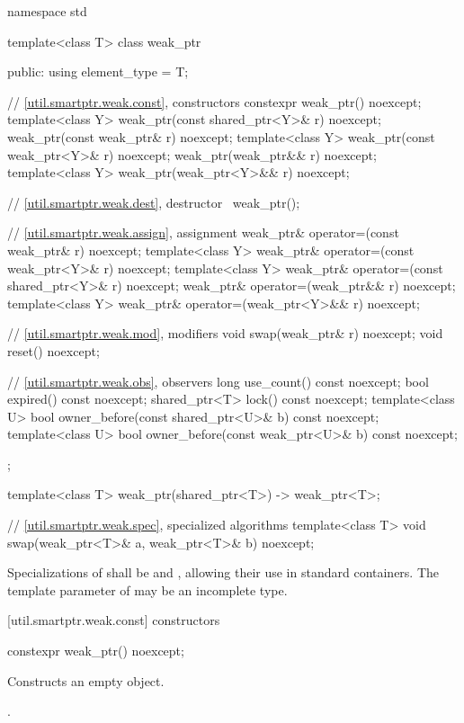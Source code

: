 \begin{codeblock}
namespace std {
  template<class T> class weak_ptr {
  public:
    using element_type = T;

    // \ref{util.smartptr.weak.const}, constructors
    constexpr weak_ptr() noexcept;
    template<class Y> weak_ptr(const shared_ptr<Y>& r) noexcept;
    weak_ptr(const weak_ptr& r) noexcept;
    template<class Y> weak_ptr(const weak_ptr<Y>& r) noexcept;
    weak_ptr(weak_ptr&& r) noexcept;
    template<class Y> weak_ptr(weak_ptr<Y>&& r) noexcept;

    // \ref{util.smartptr.weak.dest}, destructor
    ~weak_ptr();

    // \ref{util.smartptr.weak.assign}, assignment
    weak_ptr& operator=(const weak_ptr& r) noexcept;
    template<class Y> weak_ptr& operator=(const weak_ptr<Y>& r) noexcept;
    template<class Y> weak_ptr& operator=(const shared_ptr<Y>& r) noexcept;
    weak_ptr& operator=(weak_ptr&& r) noexcept;
    template<class Y> weak_ptr& operator=(weak_ptr<Y>&& r) noexcept;

    // \ref{util.smartptr.weak.mod}, modifiers
    void swap(weak_ptr& r) noexcept;
    void reset() noexcept;

    // \ref{util.smartptr.weak.obs}, observers
    long use_count() const noexcept;
    bool expired() const noexcept;
    shared_ptr<T> lock() const noexcept;
    template<class U> bool owner_before(const shared_ptr<U>& b) const noexcept;
    template<class U> bool owner_before(const weak_ptr<U>& b) const noexcept;
  };

  template<class T> weak_ptr(shared_ptr<T>) -> weak_ptr<T>;


  // \ref{util.smartptr.weak.spec}, specialized algorithms
  template<class T> void swap(weak_ptr<T>& a, weak_ptr<T>& b) noexcept;
}
\end{codeblock}

\pnum
Specializations of  shall be  and
, allowing their use in standard
containers.  The template parameter  of  may be an
incomplete type.

[util.smartptr.weak.const]{ constructors}

%
\begin{itemdecl}
constexpr weak_ptr() noexcept;
\end{itemdecl}

\begin{itemdescr}
\pnum\effects  Constructs an empty  object.

\pnum\postconditions  {}.
\end{itemdescr}

